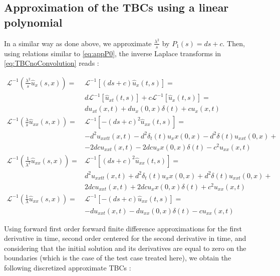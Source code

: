 \subsection{Approximation of the TBCs using a linear polynomial}

\indent In a similar way as done above, we approximate  $\frac{\lambda^2}{s}$ by $P_1(s) = ds + c$. Then, using relations similar to \eqref{eq:appP0}, the inverse Laplace transforms in \eqref{eq:TBCnoConvolution} reads :

\begin{equation}
	\begin{aligned}
    \mathcal{L}^{-1} \left( \frac{\lambda^2}{s} \hat{u}_x(s,x) \right) = & \mathcal{L}^{-1} \left[ (ds+c) \hat{u}_x(t,s) \right] = \\
    			 & d\mathcal{L}^{-1} \left[ \hat{u}_{xt}(t,s) \right] + c \mathcal{L}^{-1} \left[ \hat{u}_{x}(t,s) \right] = \\
    			 &   du_{xt}(x,t) + du_x(0,x)\delta (t) + cu_x(x,t) \\
    \mathcal{L}^{-1} \left( \frac{\lambda}{s} \hat{u}_{xx}(s,x) \right) = & \mathcal{L}^{-1} \left[ -(ds+c)^2 \hat{u}_{xx}(t,s) \right] =\\
    			&  -d^2u_{xxtt}(x,t) - d^2\delta_t(t) u_xx(0,x) - d^2 \delta(t)u_{xxt}(0,x)  + \\ 
    			& - 2dcu_{xxt}(x,t) -  2dcu_xx(0,x)\delta (t) - c^2u_{xx}(x,t) \\
    \mathcal{L}^{-1} \left( \frac{1}{\lambda^2} \hat{u}_{xx}(s,x) \right) = & \mathcal{L}^{-1} \left[ (ds+c)^2 \hat{u}_{xx}(t,s) \right] = \\
    			& d^2u_{xxtt}(x,t) + d^2\delta_t(t) u_xx(0,x) + d^2 \delta(t)u_{xxt}(0,x)  + \\
    			& 2dcu_{xxt}(x,t) +  2dcu_xx(0,x)\delta (t) + c^2u_{xx}(x,t) \\
    \mathcal{L}^{-1} \left( \frac{1}{\lambda} \hat{u}_{xx}(s,x) \right) = & \mathcal{L}^{-1} \left[ -(ds+c) \hat{u}_{xx}(t,s) \right] = \\
    			& -du_{xxt}(x,t) - du_{xx}(0,x)\delta (t) - cu_{xx}(x,t)
\end{aligned}
\end{equation}

\indent Using forward first order forward finite difference approximations for the first derivative in time, second order centered for the second derivative in time, and considering that the initial solution and its derivatives are equal to zero on the boundaries (which is the case of the test case treated here), we obtain the following discretized approximate TBCs : 

